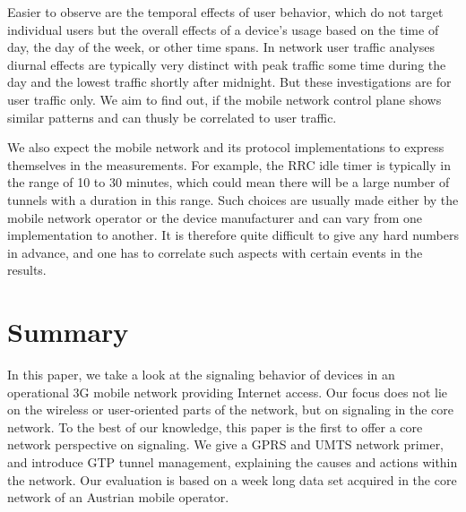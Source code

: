 Easier to observe are the temporal effects of user behavior, which do not target individual users but the overall effects of a device's usage based on the time of day, the day of the week, or other time spans. In network user traffic analyses diurnal effects are typically very distinct with peak traffic some time during the day and the lowest traffic shortly after midnight. But these investigations are for user traffic only. We aim to find out, if the mobile network control plane shows similar patterns and can thusly be correlated to user traffic.

We also expect the mobile network and its protocol implementations to express themselves in the measurements. For example, the \gls{RRC} idle timer is typically in the range of 10 to 30 minutes, which could mean there will be a large number of tunnels with a duration in this range. Such choices are usually made either by the mobile network operator or the device manufacturer and can vary from one implementation to another. It is therefore quite difficult to give any hard numbers in advance, and one has to correlate such aspects with certain events in the results.















\section{Summary}
\label{c4:sec:conclusion}
In this paper, we take a look at the signaling behavior of devices in an operational \gls{3G} mobile network providing Internet access. Our focus does not lie on the wireless or user-oriented parts of the network, but on signaling in the core network. To the best of our knowledge, this paper is the first to offer a core network perspective on signaling. We give a \gls{GPRS} and \gls{UMTS} network primer, and introduce \gls{GTP} tunnel management, explaining the causes and actions within the network. Our evaluation is based on a week long data set acquired in the core network of an Austrian mobile operator.

